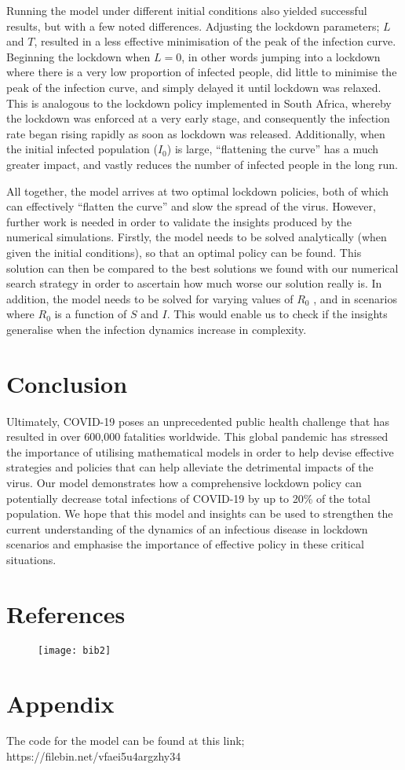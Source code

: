 \documentclass[10pt]{article}
\begin{document}
Running the model under different initial conditions also yielded successful results, but with a few noted differences. Adjusting the lockdown parameters; $L$ and $T$, resulted in a less effective minimisation of the peak of the infection curve. Beginning the lockdown when $L=0$, in other words jumping into a lockdown where there is a very low proportion of infected people, did little to minimise the peak of the infection curve, and simply delayed it until lockdown was relaxed. This is analogous to the lockdown policy implemented in South Africa, whereby the lockdown was enforced at a very early stage, and consequently the infection rate began rising rapidly as soon as lockdown was released. Additionally, when the initial infected population ($I_0$) is large, ``flattening the curve'' has a much greater impact, and vastly reduces the number of infected people in the long run. \newline

All together, the model arrives at two optimal lockdown policies, both of which can effectively ``flatten the curve'' and slow the spread of the virus. However, further work is needed in order to validate the insights produced by the numerical simulations.  Firstly, the model needs to be solved analytically (when given the initial conditions), so that an optimal policy can be found.  This solution can then be compared to the best solutions we found with our numerical search strategy in order to ascertain how much worse our solution really is.  In addition, the model needs to be solved for varying values of $R_0$ , and in scenarios where $R_0$ is a function of $S$ and $I$.  This would enable us to check if the insights generalise when the infection dynamics increase in complexity. \newline

\section{Conclusion}

Ultimately, COVID-19 poses an unprecedented public health challenge that has resulted in over 600,000 fatalities worldwide. This global pandemic has stressed the importance of utilising mathematical models in order to help devise effective strategies and policies that can help alleviate the detrimental impacts of the virus. Our model demonstrates how a comprehensive lockdown policy can potentially decrease total infections of COVID-19 by up to 20\% of the total population. We hope that this model and insights can be used to strengthen the current understanding of the dynamics of an infectious disease in lockdown scenarios and emphasise the importance of effective policy in these critical situations.

\section{References}

\begin{figure}[H]
\centerline{\texttt{[image: bib2]}}
\end{figure}

\section{Appendix}

The code for the model can be found at this link; \newline
https://filebin.net/vfaei5u4argzhy34
\end{document}
